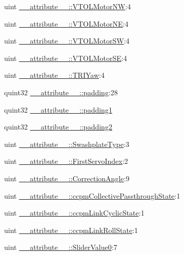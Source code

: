 \begin{DoxyCompactItemize}
uint \hyperlink{group___config_plugin_gaad074461234c2de58881eb8f2923e6e7}{\-\_\-\-\_\-attribute\-\_\-\-\_\-\-::\-V\-T\-O\-L\-Motor\-N\-W}\-:4
\item 
uint \hyperlink{group___config_plugin_gab2efff1f0b5cdb98443f986d78f75691}{\-\_\-\-\_\-attribute\-\_\-\-\_\-\-::\-V\-T\-O\-L\-Motor\-N\-E}\-:4
\item 
uint \hyperlink{group___config_plugin_ga6c7dfd25d7944b3ce84871fed9c6c9ef}{\-\_\-\-\_\-attribute\-\_\-\-\_\-\-::\-V\-T\-O\-L\-Motor\-S\-W}\-:4
\item 
uint \hyperlink{group___config_plugin_gaa954495952cf0b6ae1f8a25d95ca09c0}{\-\_\-\-\_\-attribute\-\_\-\-\_\-\-::\-V\-T\-O\-L\-Motor\-S\-E}\-:4
\item 
uint \hyperlink{group___config_plugin_ga63632c414ddd0db93282a775cff6ee2b}{\-\_\-\-\_\-attribute\-\_\-\-\_\-\-::\-T\-R\-I\-Yaw}\-:4
\item 
quint32 \hyperlink{group___config_plugin_gae439ab85c005f3400498997049fd50e8}{\-\_\-\-\_\-attribute\-\_\-\-\_\-\-::padding}\-:28
\item 
quint32 \hyperlink{group___config_plugin_ga1d4a76a1f0c36316d50d1ae3f788ef4e}{\-\_\-\-\_\-attribute\-\_\-\-\_\-\-::padding1}
\item 
quint32 \hyperlink{group___config_plugin_ga445d386b31eb43aafbd971345a5b221e}{\-\_\-\-\_\-attribute\-\_\-\-\_\-\-::padding2}
\item 
uint \hyperlink{group___config_plugin_ga4f96550cdd283e7bb8b8fb7ec7d3cc09}{\-\_\-\-\_\-attribute\-\_\-\-\_\-\-::\-Swashplate\-Type}\-:3
\item 
uint \hyperlink{group___config_plugin_ga7db78067a379a075d4ead422019337d3}{\-\_\-\-\_\-attribute\-\_\-\-\_\-\-::\-First\-Servo\-Index}\-:2
\item 
uint \hyperlink{group___config_plugin_ga9540a6905aee7cc229adfd3bd687b86a}{\-\_\-\-\_\-attribute\-\_\-\-\_\-\-::\-Correction\-Angle}\-:9
\item 
uint \hyperlink{group___config_plugin_ga14bffa0ebae107df7ec9a9b6e06294a9}{\-\_\-\-\_\-attribute\-\_\-\-\_\-\-::ccpm\-Collective\-Passthrough\-State}\-:1
\item 
uint \hyperlink{group___config_plugin_ga31785760b6dab4f2006d4824ef4b7e5b}{\-\_\-\-\_\-attribute\-\_\-\-\_\-\-::ccpm\-Link\-Cyclic\-State}\-:1
\item 
uint \hyperlink{group___config_plugin_gaecc16f8488db13ba16c2c6e1d0053239}{\-\_\-\-\_\-attribute\-\_\-\-\_\-\-::ccpm\-Link\-Roll\-State}\-:1
\item 
uint \hyperlink{group___config_plugin_ga2787c0bb4ab205071860d7a5c90cb7a6}{\-\_\-\-\_\-attribute\-\_\-\-\_\-\-::\-Slider\-Value0}\-:7

\end{DoxyCompactItemize}
